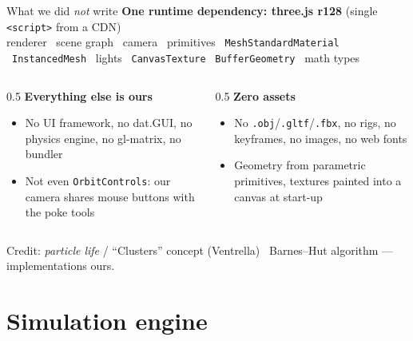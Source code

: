 \documentclass[10pt]{beamer}
\begin{document}
\begin{frame}{What we did \emph{not} write}
	\textbf{One runtime dependency: three.js r128} (single \texttt{<script>} from a CDN)\\
	{\small renderer \textbullet\ scene graph \textbullet\ camera \textbullet\ primitives \textbullet\
	\texttt{MeshStandardMaterial} \textbullet\ \texttt{InstancedMesh} \textbullet\ lights \textbullet\
	\texttt{CanvasTexture} \textbullet\ \texttt{BufferGeometry} \textbullet\ math types}
	\vspace{1ex}
	\begin{columns}[T]
		\begin{column}{0.5\textwidth}
			\textbf{Everything else is ours}
			\begin{itemize}\small
				\item No UI framework, no dat.GUI, no physics engine, no gl-matrix, no bundler
				\item Not even \texttt{OrbitControls}: our camera shares mouse buttons with the poke tools
			\end{itemize}
		\end{column}
		\begin{column}{0.5\textwidth}
			\textbf{Zero assets}
			\begin{itemize}\small
				\item No \texttt{.obj}/\texttt{.gltf}/\texttt{.fbx}, no rigs, no keyframes, no images, no web fonts
				\item Geometry from parametric primitives, textures painted into a canvas at start-up
			\end{itemize}
		\end{column}
	\end{columns}
	\vspace{1ex}
	{\footnotesize Credit: \emph{particle life} / ``Clusters'' concept (Ventrella) \textbullet\ Barnes--Hut
		algorithm --- implementations ours.}
\end{frame}

\section{Simulation engine}
\end{document}
